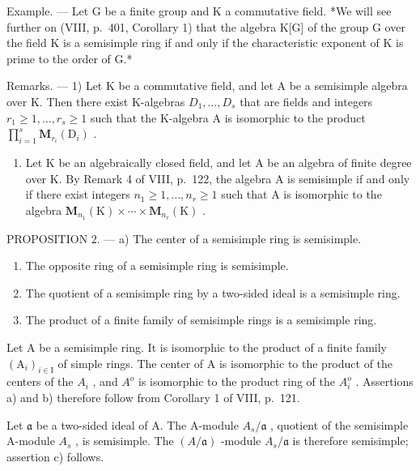 Example. --- Let G be a finite group and K a commutative field. *We will see further on (VIII, p.~401, Corollary 1) that the algebra K{[}G{]} of the group G over the field K is a semisimple ring if and only if the characteristic exponent of K is prime to the order of G.*

Remarks. --- 1) Let K be a commutative field, and let A be a semisimple algebra over K. Then there exist K-algebras \(D_{1},\ldots,D_{s}\) that are fields and integers \(r_{1}\geqslant1,\ldots,r_{s}\geqslant1\) such that the K-algebra A is isomorphic to the product \(\prod_{i=1}^{s}\mathbf{M}_{r_{i}}(\mathrm{D}_{i})\) .

\begin{enumerate}
\def\labelenumi{\arabic{enumi})}
\setcounter{enumi}{1}
\tightlist
\item
  Let K be an algebraically closed field, and let A be an algebra of finite degree over K. By Remark 4 of VIII, p.~122, the algebra A is semisimple if and only if there exist integers \(n_{1} \geqslant 1, \ldots, n_{r} \geqslant 1\) such that A is isomorphic to the algebra \(\mathbf{M}_{n_{1}}(\mathrm{K}) \times \cdots \times \mathbf{M}_{n_{r}}(\mathrm{K})\) .
\end{enumerate}

PROPOSITION 2. --- a) The center of a semisimple ring is semisimple.

\begin{enumerate}
\def\labelenumi{\alph{enumi})}
\setcounter{enumi}{1}
\item
  The opposite ring of a semisimple ring is semisimple.
\item
  The quotient of a semisimple ring by a two-sided ideal is a semisimple ring.
\item
  The product of a finite family of semisimple rings is a semisimple ring.
\end{enumerate}

Let A be a semisimple ring. It is isomorphic to the product of a finite family \((\mathrm{A}_{i})_{i\in\mathrm{I}}\) of simple rings. The center of A is isomorphic to the product of the centers of the \(A_{i}\) , and \(A^{o}\) is isomorphic to the product ring of the \(A_{i}^{o}\) . Assertions a) and b) therefore follow from Corollary 1 of VIII, p.~121.

Let \(\mathfrak{a}\) be a two-sided ideal of A. The A-module \(A_s / \mathfrak{a}\) , quotient of the semisimple A-module \(A_s\) , is semisimple. The \((A / \mathfrak{a})\) -module \(A_s / \mathfrak{a}\) is therefore semisimple; assertion c) follows.

